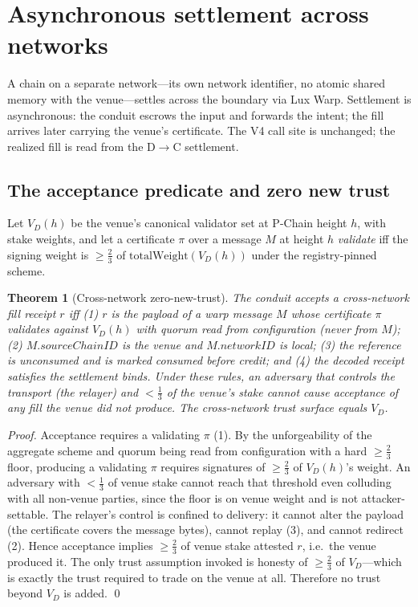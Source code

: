 \documentclass[11pt,a4paper]{article}
\newtheorem{theorem}{Theorem}[section]
\begin{document}
\section{Asynchronous settlement across networks}
\label{sec:async}

A chain on a separate network---its own network identifier, no atomic shared memory with the
venue---settles across the boundary via Lux Warp. Settlement is asynchronous: the conduit escrows
the input and forwards the intent; the fill arrives later carrying the venue's certificate. The V4
call site is unchanged; the realized fill is read from the D$\to$C settlement.

\subsection{The acceptance predicate and zero new trust}

Let $V_D(h)$ be the venue's canonical validator set at P-Chain height $h$, with stake weights, and
let a certificate $\pi$ over a message $M$ at height $h$ \emph{validate} iff the signing weight is
$\geq \tfrac{2}{3}$ of $\mathrm{totalWeight}(V_D(h))$ under the registry-pinned scheme.

\begin{theorem}[Cross-network zero-new-trust]\label{thm:trust}
The conduit accepts a cross-network fill receipt $r$ iff (1) $r$ is the payload of a warp message
$M$ whose certificate $\pi$ validates against $V_D(h)$ with quorum read from configuration (never
from $M$); (2) $M.\mathit{sourceChainID}$ is the venue and $M.\mathit{networkID}$ is local; (3) the
reference is unconsumed and is marked consumed before credit; and (4) the decoded receipt satisfies
the settlement binds. Under these rules, an adversary that controls the transport (the relayer) and
$<\tfrac{1}{3}$ of the venue's stake cannot cause acceptance of any fill the venue did not produce.
The cross-network trust surface equals $V_D$.
\end{theorem}

\begin{proof}
Acceptance requires a validating $\pi$ (1). By the unforgeability of the aggregate scheme and
quorum being read from configuration with a hard $\geq\!\tfrac{2}{3}$ floor, producing a validating
$\pi$ requires signatures of $\geq\tfrac{2}{3}$ of $V_D(h)$'s weight. An adversary with
$<\tfrac{1}{3}$ of venue stake cannot reach that threshold even colluding with all non-venue
parties, since the floor is on venue weight and is not attacker-settable. The relayer's control is
confined to delivery: it cannot alter the payload (the certificate covers the message bytes),
cannot replay (3), and cannot redirect (2). Hence acceptance implies $\geq\tfrac{2}{3}$ of venue
stake attested $r$, i.e.\ the venue produced it. The only trust assumption invoked is honesty of
$\geq\tfrac{2}{3}$ of $V_D$---which is exactly the trust required to trade on the venue at all.
Therefore no trust beyond $V_D$ is added. \qed
\end{proof}
\end{document}
